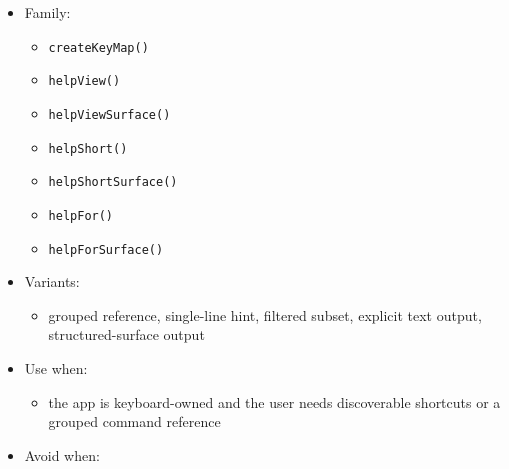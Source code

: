 \begin{itemize}
\tightlist
\item
  Family:

  \begin{itemize}
  \tightlist
  \item
    \texttt{c\allowbreak{}r\allowbreak{}e\allowbreak{}a\allowbreak{}t\allowbreak{}e\allowbreak{}K\allowbreak{}e\allowbreak{}y\allowbreak{}M\allowbreak{}a\allowbreak{}p\allowbreak{}(\allowbreak{})}
  \item
    \texttt{h\allowbreak{}e\allowbreak{}l\allowbreak{}p\allowbreak{}V\allowbreak{}i\allowbreak{}e\allowbreak{}w\allowbreak{}(\allowbreak{})}
  \item
    \texttt{h\allowbreak{}e\allowbreak{}l\allowbreak{}p\allowbreak{}V\allowbreak{}i\allowbreak{}e\allowbreak{}w\allowbreak{}S\allowbreak{}u\allowbreak{}r\allowbreak{}f\allowbreak{}a\allowbreak{}c\allowbreak{}e\allowbreak{}(\allowbreak{})}
  \item
    \texttt{h\allowbreak{}e\allowbreak{}l\allowbreak{}p\allowbreak{}S\allowbreak{}h\allowbreak{}o\allowbreak{}r\allowbreak{}t\allowbreak{}(\allowbreak{})}
  \item
    \texttt{h\allowbreak{}e\allowbreak{}l\allowbreak{}p\allowbreak{}S\allowbreak{}h\allowbreak{}o\allowbreak{}r\allowbreak{}t\allowbreak{}S\allowbreak{}u\allowbreak{}r\allowbreak{}f\allowbreak{}a\allowbreak{}c\allowbreak{}e\allowbreak{}(\allowbreak{})}
  \item
    \texttt{h\allowbreak{}e\allowbreak{}l\allowbreak{}p\allowbreak{}F\allowbreak{}o\allowbreak{}r\allowbreak{}(\allowbreak{})}
  \item
    \texttt{h\allowbreak{}e\allowbreak{}l\allowbreak{}p\allowbreak{}F\allowbreak{}o\allowbreak{}r\allowbreak{}S\allowbreak{}u\allowbreak{}r\allowbreak{}f\allowbreak{}a\allowbreak{}c\allowbreak{}e\allowbreak{}(\allowbreak{})}
  \end{itemize}
\item
  Variants:

  \begin{itemize}
  \tightlist
  \item
    grouped reference, single-line hint, filtered subset, explicit text output, structured-surface output
  \end{itemize}
\item
  Use when:

  \begin{itemize}
  \tightlist
  \item
    the app is keyboard-owned and the user needs discoverable shortcuts or a grouped command reference
  \end{itemize}
\item
  Avoid when:


\end{itemize}
